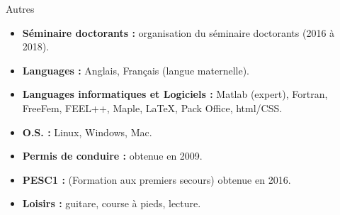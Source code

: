 \documentclass[10pt,a4paper]{report}
\begin{document}
\vspace{0.6cm}
\noindent
{\selectfont
\begin{Large}
Autres
\end{Large}
\hrulefill
}

\vspace{1cm}
\noindent
\begin{itemize}
\item \textbf{Séminaire doctorants :} organisation du séminaire doctorants (2016 à 2018).
\item \textbf{Languages :} Anglais, Français (langue maternelle).
\item \textbf{Languages informatiques et Logiciels :} Matlab (expert), Fortran, FreeFem, FEEL++, Maple, \LaTeX, Pack Office, html/CSS.
\item \textbf{O.S. :} Linux, Windows, Mac.
\item \textbf{Permis de conduire :} obtenue en 2009.
\item \textbf{PESC1 :} (Formation aux premiers secours) obtenue en 2016.
\item \textbf{Loisirs :} guitare, course à pieds, lecture.

\end{itemize}
\end{document}
